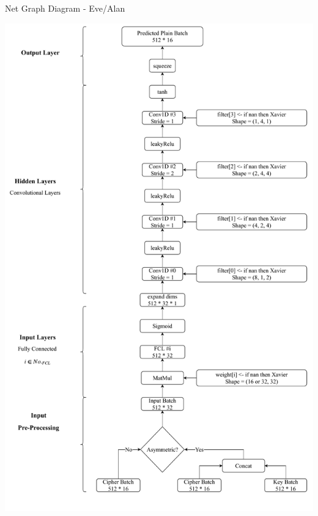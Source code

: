 \documentclass[a4paper, 12pt]{report}
\begin{document}
\begin{blockfigure}{ Net Graph Diagram - Eve/Alan}
		\begin{center}
			\includegraphics[width = \textwidth]{Eavesdropper-Diagram}
		\end{center}
\end{blockfigure}
\newpage
\end{document}
